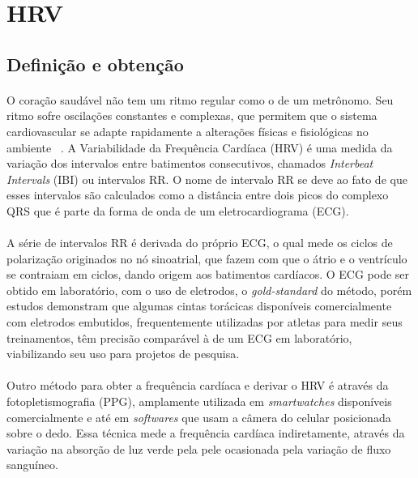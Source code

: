 
    \section{HRV}
    \label{HRV}
        
        \subsection {Definição e obtenção}
        \paragraph{} O coração saudável não tem um ritmo regular como o de um metrônomo. Seu ritmo sofre oscilações constantes e complexas, que permitem que o sistema cardiovascular se adapte rapidamente a alterações físicas e fisiológicas no ambiente ~\cite{Hansen2004HeartDetraining}. A Variabilidade da Frequência Cardíaca (HRV) é uma medida da variação dos intervalos entre batimentos consecutivos, chamados \textit{Interbeat Intervals} (IBI) ou intervalos RR. O nome de intervalo RR se deve ao fato de que esses intervalos são calculados como a distância entre dois picos do complexo QRS que é parte da forma de onda de um eletrocardiograma (ECG). ~\cite{TaskForceoftheEuropeanSocietyofCardiologytheNorthAmericanSocietyofPacing1996HeartUse}
        
        \paragraph{} A série de intervalos RR é derivada do próprio ECG, o qual mede os ciclos de polarização originados no nó sinoatrial, que fazem com que o átrio e o ventrículo se contraiam em ciclos, dando origem aos batimentos cardíacos. O ECG pode ser obtido em laboratório, com o uso de eletrodos, o \textit{gold-standard} do método, porém estudos \cite{Plews2017ComparisonMethods, Giles2016ValidityRest.} demonstram que algumas cintas torácicas disponíveis comercialmente com eletrodos embutidos, frequentemente utilizadas por atletas para medir seus treinamentos, têm precisão comparável à de um ECG em laboratório, viabilizando seu uso para projetos de pesquisa. 
        
        \paragraph{} Outro método para obter a frequência cardíaca e derivar o HRV é através da fotopletismografia (PPG), amplamente utilizada em \textit{smartwatches} disponíveis comercialmente e até em \textit{softwares} que usam a câmera do celular posicionada sobre o dedo. Essa técnica mede a frequência cardíaca indiretamente, através da variação na absorção de luz verde pela pele ocasionada pela variação de fluxo sanguíneo. 
       

